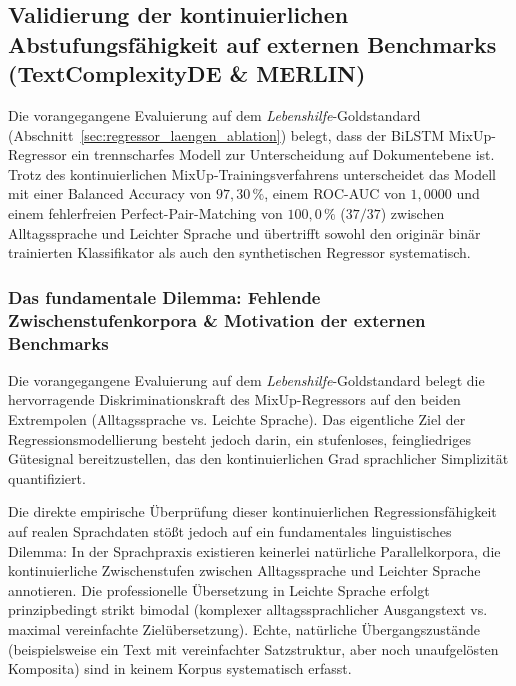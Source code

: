 \subsection{Validierung der kontinuierlichen Abstufungsfähigkeit auf externen Benchmarks (TextComplexityDE \& MERLIN)}
\label{sec:validierung_abstufung_externe_benchmarks}

Die vorangegangene Evaluierung auf dem \textit{Lebenshilfe}-Goldstandard (Abschnitt~\ref{sec:regressor_laengen_ablation}) belegt, dass der BiLSTM MixUp-Regressor ein trennscharfes Modell zur Unterscheidung auf Dokumentebene ist. Trotz des kontinuierlichen MixUp-Trainingsverfahrens unterscheidet das Modell mit einer Balanced Accuracy von $97{,}30\,\%$, einem ROC-AUC von $1{,}0000$ und einem fehlerfreien Perfect-Pair-Matching von $100{,}0\,\%$ ($37/37$) zwischen Alltagssprache und Leichter Sprache und übertrifft sowohl den originär binär trainierten Klassifikator als auch den synthetischen Regressor systematisch.

\subsubsection{Das fundamentale Dilemma: Fehlende Zwischenstufenkorpora \& Motivation der externen Benchmarks}
\label{sec:dilemma_zwischenstufen}

Die vorangegangene Evaluierung auf dem \textit{Lebenshilfe}-Goldstandard belegt die hervorragende Diskriminationskraft des MixUp-Regressors auf den beiden Extrempolen (Alltagssprache vs. Leichte Sprache). Das eigentliche Ziel der Regressionsmodellierung besteht jedoch darin, ein stufenloses, feingliedriges Gütesignal bereitzustellen, das den kontinuierlichen Grad sprachlicher Simplizität quantifiziert.

Die direkte empirische Überprüfung dieser kontinuierlichen Regressionsfähigkeit auf realen Sprachdaten stößt jedoch auf ein fundamentales linguistisches Dilemma: In der Sprachpraxis existieren keinerlei natürliche Parallelkorpora, die kontinuierliche Zwischenstufen zwischen Alltagssprache und Leichter Sprache annotieren. Die professionelle Übersetzung in Leichte Sprache erfolgt prinzipbedingt strikt bimodal (komplexer alltagssprachlicher Ausgangstext vs. maximal vereinfachte Zielübersetzung). Echte, natürliche Übergangszustände (beispielsweise ein Text mit vereinfachter Satzstruktur, aber noch unaufgelösten Komposita) sind in keinem Korpus systematisch erfasst.

